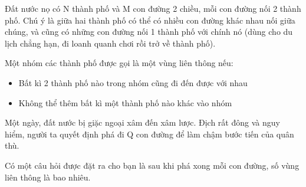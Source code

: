Đất nước nọ có N thành phố và M con đường 2 chiều, mỗi con đường nối 2 thành phố. Chú ý là giữa hai thành phố có thể có nhiều con đường khác nhau nối giữa chúng, và cũng có những con đường nối 1 thành phố với chính nó (dùng cho du lịch chẳng hạn, đi loanh quanh chơi rồi trở về thành phố).  

   Một nhóm các thành phố được gọi là một vùng liên thông nếu:  
\begin{itemize}
	\item     Bất kì 2 thành phố nào trong nhóm cũng đi đến được với nhau   
	\item     Không thể thêm bất kì một thành phố nào khác vào nhóm   
\end{itemize}

   Một ngày, đất nước bị giặc ngoại xâm đến xâm lược. Địch rất đông và nguy hiểm, người ta quyết định phá đi Q con đường để làm chậm bước tiến của quân thù.  

   Có một câu hỏi được đặt ra cho bạn là sau khi phá xong mỗi con đường, số vùng liên thông là bao nhiêu.  

\